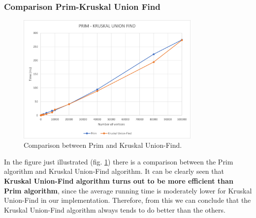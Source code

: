 \subsubsection{Comparison Prim-Kruskal Union Find}
\begin{figure}[H]
    \centering
    \includegraphics[width=0.8\textwidth]{./img/ComparisonPrimKruskal.png}
    \caption{Comparison between Prim and Kruskal Union-Find.}
    \label{fig:comparison}
\end{figure}
In the figure just illustrated (fig. \ref{fig:comparison}) there is a comparison between the Prim algorithm 
and Kruskal Union-Find algorithm. It can be clearly seen that \textbf{Kruskal Union-Find algorithm turns out to be more 
efficient than Prim algorithm}, since the average running time is moderately lower for Kruskal Union-Find 
in our implementation. Therefore, from this we can conclude that the Kruskal Union-Find algorithm always tends to do 
better than the others.